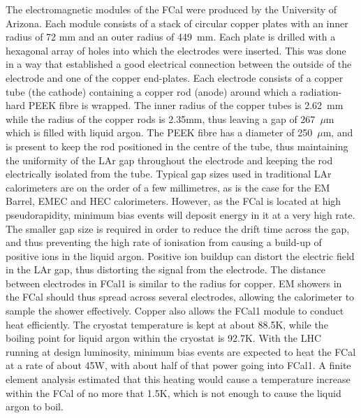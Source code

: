 The electromagnetic modules of the FCal were produced by the University of Arizona. Each module consists of a stack of circular copper plates with an inner radius of 72 mm and an outer radius of 449~mm.  Each plate is drilled with a hexagonal array of holes into which the electrodes were inserted. This was done in a way that established a good electrical connection between the outside of the electrode and one of the copper end-plates. Each electrode consists of a copper tube (the cathode) containing a copper rod (anode) around which a radiation-hard PEEK fibre is wrapped. The inner radius of the copper tubes is 2.62~mm while the radius of the copper rods is 2.35mm, thus leaving a gap of 267~$\mu$m which is filled with liquid argon. The PEEK fibre has a diameter of 250~$\mu$m, and is present to keep the rod positioned in the centre of the tube, thus maintaining the uniformity of the LAr gap throughout the electrode and keeping the rod electrically isolated from the tube. Typical gap sizes used in traditional LAr calorimeters are on the order of a few millimetres, as is the case for the EM Barrel, EMEC and HEC calorimeters. However, as the FCal is located at high pseudorapidity, minimum bias events will deposit energy in it at a very high rate. The smaller gap size is required in order to reduce the drift time across the gap, and thus preventing the high rate of ionisation from causing a build-up of positive ions in the liquid argon. Positive ion buildup can distort the electric field in the LAr gap, thus distorting the signal from the electrode.
The distance between electrodes in FCal1 is similar to the \moliere radius  for copper. EM showers in the FCal should thus spread across several electrodes, allowing the calorimeter to sample the shower effectively. Copper also allows the FCal1 module to conduct heat efficiently. The cryostat temperature is kept at about 88.5K, while the boiling point for liquid argon within the cryostat is 92.7K. With the LHC running at design luminosity, minimum bias events are expected to heat the FCal at a rate of about 45W, with about half of that power going into FCal1. A finite element analysis estimated that this heating would cause a temperature increase within the FCal of no more that 1.5K, which is not enough to cause the liquid argon to boil\cite{FCal_jinst_2010}.

%
%
%
%
%

